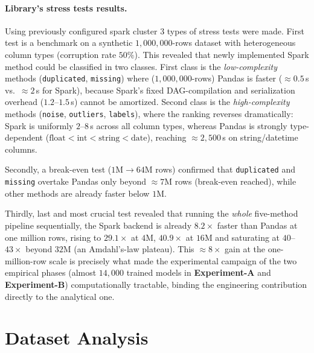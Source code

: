 \documentclass[a4paper, 9pt]{extarticle}
\begin{document}
\paragraph{Library's stress tests results.}
Using previously configured spark cluster 3 types of stress tests were made. First test is a benchmark on a synthetic $1{,}000{,}000$-rows dataset with heterogeneous column types (corruption rate $50\%$). This revealed that newly implemented Spark method could be classified in two classes. First class is the \emph{low-complexity} methods (\texttt{duplicated}, \texttt{missing}) where ($1{,}000{,}000$-rows) Pandas is faster ($\approx 0.5$\,s vs.\ $\approx 2$\,s for Spark), because Spark's fixed DAG-compilation and serialization overhead ($1.2$--$1.5$\,s) cannot be amortized. Second class is the \emph{high-complexity} methods (\texttt{noise}, \texttt{outliers}, \texttt{labels}), where the ranking reverses dramatically: Spark is uniformly $2$--$8$\,s across all column types, whereas Pandas is strongly type-dependent ($\text{float}<\text{int}<\text{string}<\text{date}$), reaching $\approx 2{,}500$\,s on string/datetime columns. 

Secondly, a break-even test ($1$M$\to$$64$M rows) confirmed that \texttt{duplicated} and \texttt{missing} overtake Pandas only beyond $\approx 7$M rows (break-even reached), while other methods are already faster below $1$M. 

Thirdly, last and most crucial test revealed that running the \emph{whole} five-method pipeline sequentially, the Spark backend is already $8.2\times$ faster than Pandas at one million rows, rising to $29.1\times$ at $4$M, $40.9\times$ at $16$M and saturating at $40$--$43\times$ beyond $32$M (an Amdahl's-law plateau). This $\approx 8\times$ gain at the one-million-row scale is precisely what made the experimental campaign of the two empirical phases (almost $14{,}000$ trained models in \textbf{Experiment-A} and \textbf{Experiment-B}) computationally tractable, binding the engineering contribution directly to the analytical one.

\section{Dataset Analysis}
\end{document}
